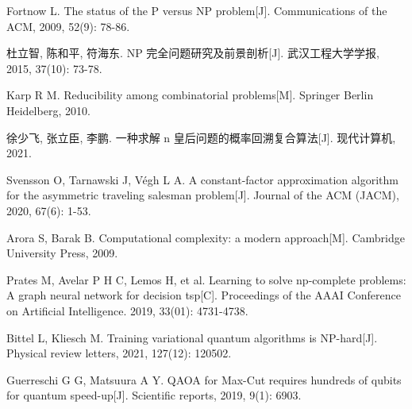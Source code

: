 \documentclass[UTF8,openany,zihao=5]{ctexbook}
\begin{document}
\setlength{\bibsep}{1ex}  %
\begin{thebibliography}{99}
  \thispagestyle{plain}


  Fortnow L. The status of the P versus NP problem[J]. Communications of the ACM, 2009, 52(9): 78-86.

  杜立智, 陈和平, 符海东. NP 完全问题研究及前景剖析[J]. 武汉工程大学学报, 2015, 37(10): 73-78.

  Karp R M. Reducibility among combinatorial problems[M]. Springer Berlin Heidelberg, 2010.

  徐少飞, 张立臣, 李鹏. 一种求解 n 皇后问题的概率回溯复合算法[J]. 现代计算机, 2021.

  Svensson O, Tarnawski J, Végh L A. A constant-factor approximation algorithm for the asymmetric traveling salesman problem[J]. Journal of the ACM (JACM), 2020, 67(6): 1-53.

  Arora S, Barak B. Computational complexity: a modern approach[M]. Cambridge University Press, 2009.

  Prates M, Avelar P H C, Lemos H, et al. Learning to solve np-complete problems: A graph neural network for decision tsp[C]. Proceedings of the AAAI Conference on Artificial Intelligence. 2019, 33(01): 4731-4738.

  Bittel L, Kliesch M. Training variational quantum algorithms is NP-hard[J]. Physical review letters, 2021, 127(12): 120502.

  Guerreschi G G, Matsuura A Y. QAOA for Max-Cut requires hundreds of qubits for quantum speed-up[J]. Scientific reports, 2019, 9(1): 6903.
\end{thebibliography}
\end{document}
